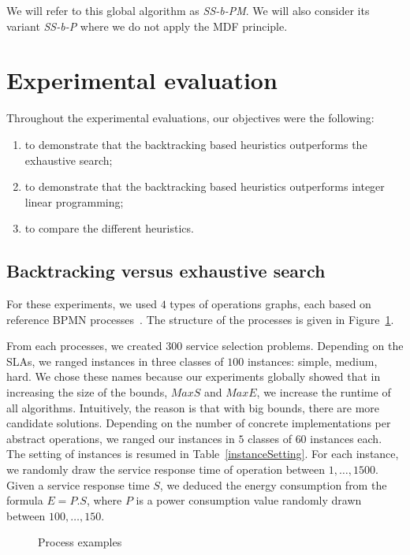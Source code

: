\documentclass[a4paper]{article}
\begin{document}
We will refer to this global algorithm as {\it SS-b-PM}. We will also consider its variant {\it SS-b-P} 
where we do not apply the MDF principle. 


\section{Experimental evaluation} \label{ExperimentalEvaluation}

 Throughout the experimental evaluations, our objectives were the following:
\begin{enumerate}
\item to demonstrate that the backtracking based heuristics outperforms the exhaustive search;
\item to demonstrate that the backtracking based heuristics outperforms integer linear programming;
\item to compare the different heuristics.
\end{enumerate}

\subsection{Backtracking versus exhaustive search}

For these experiments, we used $4$ types of operations graphs, each based on 
reference BPMN processes~\cite{Omg,Freund}. The structure of the processes is given 
in Figure~\ref{figProcess}.

From each processes, we created $300$ service selection problems. 
Depending on the SLAs, we ranged instances in three classes of $100$ instances: simple, medium, hard. 
We chose these names because our experiments globally showed  that in increasing the size of the bounds, 
$MaxS$ and $MaxE$, we increase the runtime of all algorithms. Intuitively, the reason is that with 
big bounds, there are more candidate solutions.  
Depending on the number of concrete implementations per abstract operations, 
we ranged our instances in $5$ classes of $60$ instances each. The setting of instances 
is resumed in Table~\ref{instanceSetting}. 
For each instance, we randomly draw the service response time of operation between 
$1,\dots, 1500$. Given a service response time $S$, we deduced the energy consumption from 
the formula $E = P.S$, where $P$ is a power consumption value randomly drawn  between $100,\dots,150$.



\begin{figure}[ht]
\centering
{}
\caption{Process examples}
\label{figProcess}
\end{figure}
\end{document}
